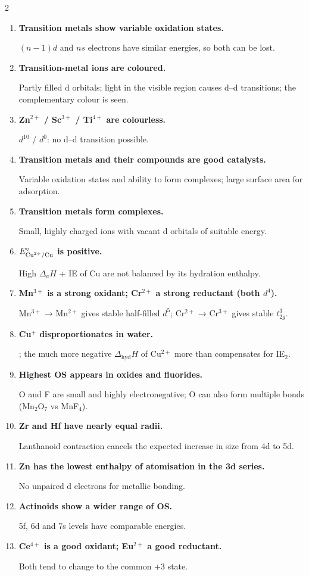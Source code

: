 \documentclass[10pt,a4paper]{extarticle}
\newenvironment{rqlist}{\begin{enumerate}[leftmargin=12pt,label={\sffamily\bfseries\scriptsize\color{uc}\arabic*.},itemsep=1pt]}{\end{enumerate}}
\newcommand{\ans}{\par\hspace*{2pt}{\color{uc}$\hookrightarrow$}\;}
\begin{document}
\begin{multicols}{2}
\begin{rqlist}
\item \textbf{Transition metals show variable oxidation states.}\ans $(n-1)d$ and $ns$ electrons have similar energies, so both can be lost.
\item \textbf{Transition-metal ions are coloured.}\ans Partly filled d orbitals; light in the visible region causes d--d transitions; the complementary colour is seen.
\item \textbf{Zn$^{2+}$ / Sc$^{3+}$ / Ti$^{4+}$ are colourless.}\ans $d^{10}$ / $d^0$: no d--d transition possible.
\item \textbf{Transition metals and their compounds are good catalysts.}\ans Variable oxidation states and ability to form complexes; large surface area for adsorption.
\item \textbf{Transition metals form complexes.}\ans Small, highly charged ions with vacant d orbitals of suitable energy.
\item \textbf{$E^\circ_{\ce{Cu^2+/Cu}}$ is positive.}\ans High $\Delta_aH$ + IE of Cu are not balanced by its hydration enthalpy.
\item \textbf{Mn$^{3+}$ is a strong oxidant; Cr$^{2+}$ a strong reductant (both $d^4$).}\ans Mn$^{3+}$ → Mn$^{2+}$ gives stable half-filled $d^5$; Cr$^{2+}$ → Cr$^{3+}$ gives stable $t_{2g}^3$.
\item \textbf{Cu$^+$ disproportionates in water.}\ans {}; the much more negative $\Delta_\text{hyd}H$ of Cu$^{2+}$ more than compensates for IE$_2$.
\item \textbf{Highest OS appears in oxides and fluorides.}\ans O and F are small and highly electronegative; O can also form multiple bonds (Mn$_2$O$_7$ vs MnF$_4$).
\item \textbf{Zr and Hf have nearly equal radii.}\ans Lanthanoid contraction cancels the expected increase in size from 4d to 5d.
\item \textbf{Zn has the lowest enthalpy of atomisation in the 3d series.}\ans No unpaired d electrons for metallic bonding.
\item \textbf{Actinoids show a wider range of OS.}\ans 5f, 6d and 7s levels have comparable energies.
\item \textbf{Ce$^{4+}$ is a good oxidant; Eu$^{2+}$ a good reductant.}\ans Both tend to change to the common +3 state.
\end{rqlist}


\end{multicols}
\end{document}
